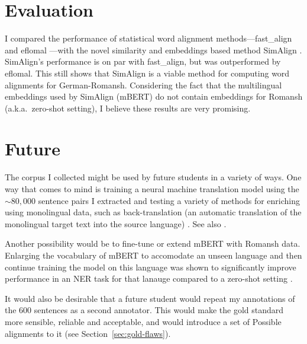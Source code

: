 \section{Evaluation}
I compared the performance of statistical word alignment methods---fast\_align \autocite{dyer-etal-2013-simple} and eflomal \autocite{Ostling2016efmaral}---with the novel similarity and embeddings based method SimAlign \autocite{jalili-sabet-etal-2020-simalign}. 
SimAlign's performance is on par with fast\_align, but was outperformed by eflomal. 
This still shows that SimAlign is a viable method for computing word alignments for German-Romansh. 
Considering the fact that the multilingual embeddings used by SimAlign (mBERT) do not contain embeddings for Romansh (a.k.a.~zero-shot setting), I believe these results are very promising.

\section{Future}
The corpus I collected might be used by future students in a variety of ways. 
One way that comes to mind is training a neural machine translation model using the $\sim80,000$ sentence pairs I extracted and testing a variety of methods for enriching using monolingual data, such as back-translation (an automatic translation of the monolingual target text into the source language) \autocite{sennrich-etal-2016-improving}. 
See also \cite{https://doi.org/10.48550/arxiv.2107.04239}.

Another possibility would be to fine-tune or extend mBERT with Romansh data. 
Enlarging the vocabulary of mBERT to accomodate an unseen language and then continue training the model on this language was shown to significantly improve performance in an NER task for that lanauge compared to a zero-shot setting \autocite{wang-etal-2020-extending}. 

It would also be desirable that a future student would repeat my annotations of the 600 sentences as a second annotator. 
This would make the gold standard more sensible, reliable and acceptable, and would introduce a set of Possible alignments to it (see Section~\ref{sec:gold-flaws}).




